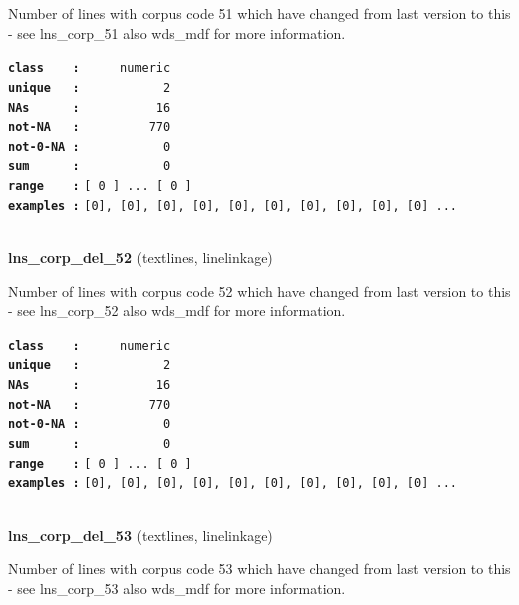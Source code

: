 \documentclass[]{article}
\begin{document}
Number of lines with corpus code 51 which have changed from last version
to this - see lns\_corp\_51 also wds\_mdf for more information.

\textbf{\texttt{class\ \ \ \ :}} \texttt{~~~~~numeric}\\
\textbf{\texttt{unique\ \ \ :}} \texttt{~~~~~~~~~~~2}\\
\textbf{\texttt{NAs\ \ \ \ \ \ :}} \texttt{~~~~~~~~~~16}\\
\textbf{\texttt{not-NA\ \ \ :}} \texttt{~~~~~~~~~770}\\
\textbf{\texttt{not-0-NA\ :}} \texttt{~~~~~~~~~~~0}\\
\textbf{\texttt{sum\ \ \ \ \ \ :}} \texttt{~~~~~~~~~~~0}\\
\textbf{\texttt{range\ \ \ \ :}}
\texttt{{[}\ 0\ {]}\ ...\ {[}\ 0\ {]}}\\
\textbf{\texttt{examples\ :}}
\texttt{{[}0{]},\ {[}0{]},\ {[}0{]},\ {[}0{]},\ {[}0{]},\ {[}0{]},\ {[}0{]},\ {[}0{]},\ {[}0{]},\ {[}0{]}\ ...}\\

~

\textbf{lns\_corp\_del\_52} (textlines, linelinkage)

Number of lines with corpus code 52 which have changed from last version
to this - see lns\_corp\_52 also wds\_mdf for more information.

\textbf{\texttt{class\ \ \ \ :}} \texttt{~~~~~numeric}\\
\textbf{\texttt{unique\ \ \ :}} \texttt{~~~~~~~~~~~2}\\
\textbf{\texttt{NAs\ \ \ \ \ \ :}} \texttt{~~~~~~~~~~16}\\
\textbf{\texttt{not-NA\ \ \ :}} \texttt{~~~~~~~~~770}\\
\textbf{\texttt{not-0-NA\ :}} \texttt{~~~~~~~~~~~0}\\
\textbf{\texttt{sum\ \ \ \ \ \ :}} \texttt{~~~~~~~~~~~0}\\
\textbf{\texttt{range\ \ \ \ :}}
\texttt{{[}\ 0\ {]}\ ...\ {[}\ 0\ {]}}\\
\textbf{\texttt{examples\ :}}
\texttt{{[}0{]},\ {[}0{]},\ {[}0{]},\ {[}0{]},\ {[}0{]},\ {[}0{]},\ {[}0{]},\ {[}0{]},\ {[}0{]},\ {[}0{]}\ ...}\\

~

\textbf{lns\_corp\_del\_53} (textlines, linelinkage)

Number of lines with corpus code 53 which have changed from last version
to this - see lns\_corp\_53 also wds\_mdf for more information.
\end{document}
